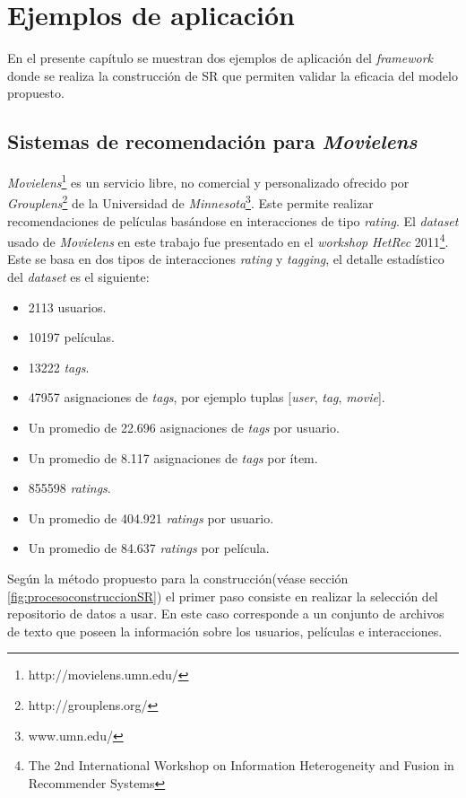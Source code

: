 \chapter{Ejemplos de aplicación}

En el presente capítulo se muestran dos ejemplos de aplicación del \textit{framework} donde se realiza la construcción de SR que permiten validar la eficacia del modelo propuesto.

\section{Sistemas de recomendación para \textit{Movielens}}

\textit{Movielens}\footnote{http://movielens.umn.edu/} es un servicio libre, no comercial y personalizado ofrecido por \textit{Grouplens}\footnote{http://grouplens.org/} de la Universidad de \textit{Minnesota}\footnote{www.umn.edu/}. Este permite realizar recomendaciones de películas basándose en interacciones de tipo \textit{rating}. El \textit{dataset} usado de \textit{Movielens} en este trabajo fue presentado en el \textit{workshop} \textit{HetRec} 2011\footnote{The 2nd International Workshop on Information Heterogeneity and Fusion in Recommender Systems}. Este se basa en dos tipos de interacciones \textit{rating} y \textit{tagging}, el detalle estadístico del \textit{dataset} es el siguiente:

\begin{itemize}
	\item 2113 usuarios.
	\item 10197 películas.
	\item 13222 \textit{tags}.
	\item 47957 asignaciones de \textit{tags}, por ejemplo tuplas [\textit{user}, \textit{tag}, \textit{movie}].
	\item Un promedio de 22.696 asignaciones de \textit{tags} por usuario.
	\item Un promedio de 8.117 asignaciones de \textit{tags} por ítem.
	\item 855598 \textit{ratings}.
	\item Un promedio de 404.921 \textit{ratings} por usuario.
	\item Un promedio de 84.637 \textit{ratings} por película.
\end{itemize}

Según la método propuesto para la construcción(véase sección \ref{fig:procesoconstruccionSR}) el primer paso consiste en realizar la selección del repositorio de datos a usar. En este caso corresponde a un conjunto de archivos de texto que poseen la información sobre los usuarios, películas e interacciones.


